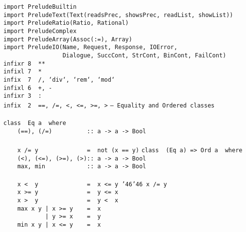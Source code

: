 \eprogB\noindent\bprogB
\mbox{\tt import\ PreludeBuiltin}\\
\mbox{\tt import\ PreludeText(Text(readsPrec,\ showsPrec,\ readList,\ showList))}\\
\mbox{\tt import\ PreludeRatio(Ratio,\ Rational)}\\
\mbox{\tt import\ PreludeComplex}\\
\mbox{\tt import\ PreludeArray(Assoc(:=),\ Array)}\\
\mbox{\tt import\ PreludeIO(Name,\ Request,\ Response,\ IOError,}\\
\mbox{\tt \ \ \ \ \ \ \ \ \ \ \ \ \ \ \ \ \ Dialogue,\ SuccCont,\ StrCont,\ BinCont,\ FailCont)}
\eprogB\noindent\bprogB
\mbox{\tt infixr\ 8\ \ **}\\
\mbox{\tt infixl\ 7\ \ *}\\
\mbox{\tt infix\ \ 7\ \ /,\ `div`,\ `rem`,\ `mod`}\\
\mbox{\tt infixl\ 6\ \ +,\ -}\\
\mbox{\tt infixr\ 3\ \ :}\\
\mbox{\tt infix\ \ 2\ \ ==,\ /=,\ <,\ <=,\ >=,\ >}
\eprogB\noindent\bprogB
\mbox{\tt --\ Equality\ and\ Ordered\ classes}\\
\mbox{\tt }\\
\mbox{\tt class\ \ Eq\ a\ \ where}\\
\mbox{\tt \ \ \ \ (==),\ (/=)\ \ \ \ \ \ \ \ \ \ ::\ a\ ->\ a\ ->\ Bool}\\
\mbox{\tt }\\
\mbox{\tt \ \ \ \ x\ /=\ y\ \ \ \ \ \ \ \ \ \ \ \ \ \ =\ \ not\ (x\ ==\ y)}
\eprogB\noindent\bprogB
\mbox{\tt class\ \ (Eq\ a)\ =>\ Ord\ a\ \ where}\\
\mbox{\tt \ \ \ \ (<),\ (<=),\ (>=),\ (>)::\ a\ ->\ a\ ->\ Bool}\\
\mbox{\tt \ \ \ \ max,\ min\ \ \ \ \ \ \ \ \ \ \ \ ::\ a\ ->\ a\ ->\ Bool}\\
\mbox{\tt }\\
\mbox{\tt \ \ \ \ x\ <\ \ y\ \ \ \ \ \ \ \ \ \ \ \ \ \ =\ \ x\ <=\ y\ {\char'46}{\char'46}\ x\ /=\ y}\\
\mbox{\tt \ \ \ \ x\ >=\ y\ \ \ \ \ \ \ \ \ \ \ \ \ \ =\ \ y\ <=\ x}\\
\mbox{\tt \ \ \ \ x\ >\ \ y\ \ \ \ \ \ \ \ \ \ \ \ \ \ =\ \ y\ <\ \ x}\\
\mbox{\tt \ \ \ \ max\ x\ y\ |\ x\ >=\ y\ \ \ \ =\ \ x}\\
\mbox{\tt \ \ \ \ \ \ \ \ \ \ \ \ |\ y\ >=\ x\ \ \ \ =\ \ y}\\
\mbox{\tt \ \ \ \ min\ x\ y\ |\ x\ <=\ y\ \ \ \ =\ \ x}\\
